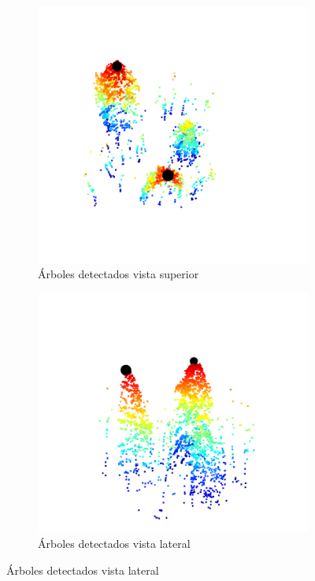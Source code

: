 \begin{figure}
\centering
  \begin{subfigure}{0.5\textwidth}
    \centering
    \includegraphics[width=0.9\linewidth]{imaxes/resdet1.png}
    \caption{Árboles detectados vista superior}
  \end{subfigure}%
  
  \begin{subfigure}{0.5\textwidth}
    \centering
    \includegraphics[width=0.9\linewidth]{imaxes/resdet1lat.png}
    \caption{Árboles detectados vista lateral}


\end{subfigure}
\end{figure}
